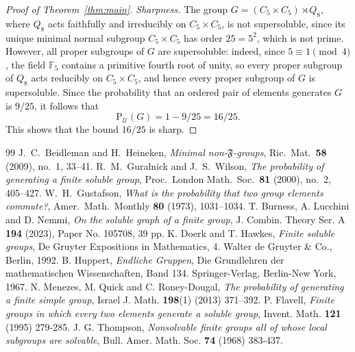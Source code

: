 \documentclass[10pt,a4paper]{amsart}
\newcommand{\Psu}{\mathrm{P}_{\mathcal{U}}}
\begin{document}
\begin{proof}[Proof of Theorem~\ref{thm:main}]
		\medskip
		\noindent\textit{Sharpness.}
The group $G = (C_5 \times C_5) \rtimes Q_8$, where $Q_8$ 
acts faithfully and irreducibly on $C_5 \times C_5$, is not 
supersoluble, since its unique minimal normal subgroup 
$C_5 \times C_5$ has order $25 = 5^2$, which is not prime. 
However, all proper subgroups of $G$ are supersoluble: indeed, 
since $5 \equiv 1 \pmod{4}$, the field $\mathbb{F}_5$ contains 
a primitive fourth root of unity, so every proper subgroup of 
$Q_8$ acts reducibly on $C_5 \times C_5$, and hence every 
proper subgroup of $G$ is supersoluble.
Since the probability that an ordered pair of elements 
generates $G$ is $9/25$, it follows that
$$\Psu(G) = 1 - 9/25 = 16/25.$$
This shows that the bound $16/25$ is sharp.
	\end{proof}
	

\begin{thebibliography}{99}
 J.~C.~Beidleman and H.~Heineken, \textit{Minimal non-$\mathfrak{F}$-groups}, Ric.\ Mat.\ \textbf{58} (2009), no.~1, 33--41.
 R.~M.~Guralnick and J.~S.~Wilson, \textit{The probability of generating a finite soluble group}, Proc.\ London Math.\ Soc.\ \textbf{81} (2000), no.~2, 405--427.
 W.~H.~Gustafson, \textit{What is the probability that two group elements commute?}, Amer.\ Math.\ Monthly \textbf{80} (1973), 1031--1034.
 T. Burness, A. Lucchini and D. Nemmi, \textit{On the soluble graph of a finite group}, J. Combin. Theory Ser. A \textbf{194} (2023), Paper No. 105708, 39 pp.
 K. Doerk and T. Hawkes, \textit{Finite soluble groups}, De Gruyter Expositions in Mathematics, 4. Walter de Gruyter \& Co., Berlin, 1992.
 B. Huppert, \textit{Endliche Gruppen}, Die Grundlehren der mathematischen Wissenschaften, Band 134. Springer-Verlag, Berlin-New York, 1967.
 N. Menezes, M. Quick and C. Roney-Dougal, \textit{The probability of generating a finite simple group}, Israel J. Math. \textbf{198}(1) (2013) 371–392.
 P. Flavell, \textit{Finite groups in which every two elements generate a soluble group}, Invent. Math. \textbf{121} (1995) 279-285.
 J. G. Thompson, \textit{Nonsolvable finite groups all of whose local subgroups are solvable}, Bull. Amer. Math. Soc. \textbf{74} (1968) 383-437.
\end{thebibliography}
\end{document}
